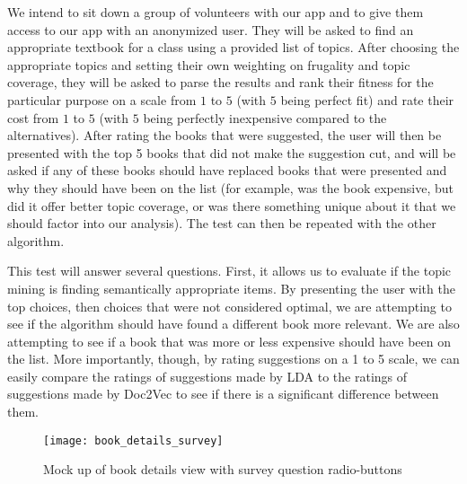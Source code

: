 We intend to sit down a group of volunteers with our app and to give them access to our app with an anonymized user.  
They will be asked to find an appropriate textbook for a class using a provided list of topics.  
After choosing the appropriate topics and setting their own weighting on frugality and topic coverage, they will be asked to parse the results and rank their fitness for the particular purpose on a scale from $1$ to $5$ (with $5$ being perfect fit) and rate their cost from $1$ to $5$ (with $5$ being perfectly inexpensive compared to the alternatives).  
After rating the books that were suggested, the user will then be presented with the top 5 books that did not make the suggestion cut, and will be asked if any of these books should have replaced books that were presented and why they should have been on the list (for example, was the book expensive, but did it offer better topic coverage, or was there something unique about it that we should factor into our analysis).  
The test can then be repeated with the other algorithm.

This test will answer several questions.  
First, it allows us to evaluate if the topic mining is finding semantically appropriate items.  
By presenting the user with the top choices, then choices that were not considered optimal, we are attempting to see if the algorithm should have found a different book more relevant.  
We are also attempting to see if a book that was more or less expensive should have been on the list.  
More importantly, though, by rating suggestions on a 1 to 5 scale, we can easily compare the ratings of suggestions made by LDA to the ratings of suggestions made by Doc2Vec to see if there is a significant difference between them.  

\begin{figure}[ht]
\label{eval_plan:mockup_survey}
\caption{Mock up of book details view with survey question radio-buttons}
\centering
\texttt{[image: book\_details\_survey]}
\end{figure}



